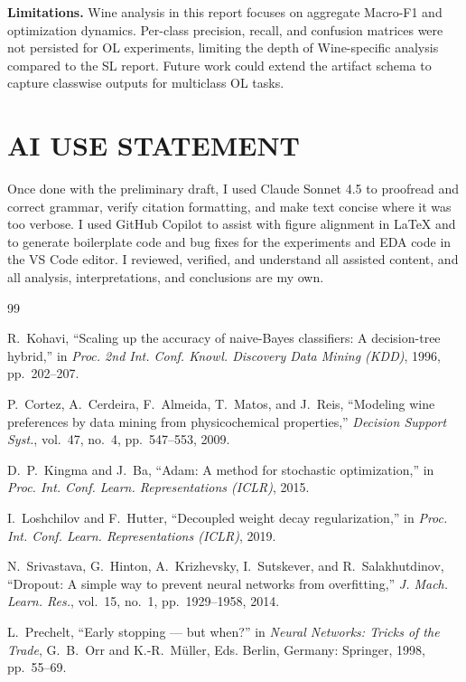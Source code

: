 \documentclass[letterpaper, 10 pt, conference]{ieeeconf}
\begin{document}
\textbf{Limitations.} Wine analysis in this report focuses on aggregate Macro-F1 and optimization dynamics. Per-class precision, recall, and confusion matrices were not persisted for OL experiments, limiting the depth of Wine-specific analysis compared to the SL report. Future work could extend the artifact schema to capture classwise outputs for multiclass OL tasks.

\section*{AI USE STATEMENT}

Once done with the preliminary draft, I used Claude Sonnet 4.5 to proofread and correct grammar, verify citation formatting, and make text concise where it was too verbose. I used GitHub Copilot to assist with figure alignment in LaTeX and to generate boilerplate code and bug fixes for the experiments and EDA code in the VS Code editor. I reviewed, verified, and understand all assisted content, and all analysis, interpretations, and conclusions are my own.

\addtolength{\textheight}{-12cm}




\begin{thebibliography}{99}

 R.~Kohavi, ``Scaling up the accuracy of naive-Bayes classifiers: A decision-tree hybrid,'' in \emph{Proc. 2nd Int. Conf. Knowl. Discovery Data Mining (KDD)}, 1996, pp.~202--207.

 P.~Cortez, A.~Cerdeira, F.~Almeida, T.~Matos, and J.~Reis, ``Modeling wine preferences by data mining from physicochemical properties,'' \emph{Decision Support Syst.}, vol.~47, no.~4, pp.~547--553, 2009.

 D.~P.~Kingma and J.~Ba, ``Adam: A method for stochastic optimization,'' in \emph{Proc. Int. Conf. Learn. Representations (ICLR)}, 2015.

 I.~Loshchilov and F.~Hutter, ``Decoupled weight decay regularization,'' in \emph{Proc. Int. Conf. Learn. Representations (ICLR)}, 2019.

 N.~Srivastava, G.~Hinton, A.~Krizhevsky, I.~Sutskever, and R.~Salakhutdinov, ``Dropout: A simple way to prevent neural networks from overfitting,'' \emph{J. Mach. Learn. Res.}, vol.~15, no.~1, pp.~1929--1958, 2014.

 L.~Prechelt, ``Early stopping --- but when?'' in \emph{Neural Networks: Tricks of the Trade}, G.~B.~Orr and K.-R.~M\"{u}ller, Eds. Berlin, Germany: Springer, 1998, pp.~55--69.

\end{thebibliography}
\end{document}
